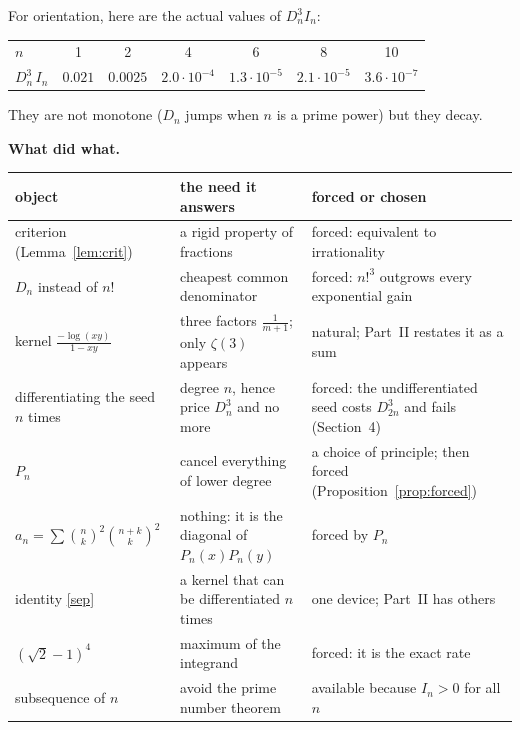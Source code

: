 \documentclass[11pt]{article}
\theoremstyle{remark}
\newcommand{\q}[1]{\medskip\noindent\textbf{#1}}
\begin{document}
\noindent For orientation, here are the actual values of $D_n^3I_n$:
\begin{center}\small
\begin{tabular}{@{}lcccccc@{}}
\toprule
$n$ & 1 & 2 & 4 & 6 & 8 & 10\\
$D_n^3\,I_n$ & $0.021$ & $0.0025$ & $2.0\cdot10^{-4}$ & $1.3\cdot10^{-5}$ & $2.1\cdot10^{-5}$ &
$3.6\cdot10^{-7}$\\
\bottomrule
\end{tabular}
\end{center}
They are not monotone ($D_n$ jumps when $n$ is a prime power) but they decay.

\q{What did what.}
\begin{center}\small
\begin{tabular}{@{}p{43mm}p{52mm}p{52mm}@{}}
\toprule
object & the need it answers & forced or chosen\\
\midrule
criterion (Lemma~\ref{lem:crit}) & a rigid property of fractions & forced: equivalent to
irrationality\\
$D_n$ instead of $n!$ & cheapest common denominator & forced: $n!^3$ outgrows every exponential gain\\
kernel $\frac{-\log(xy)}{1-xy}$ & three factors $\frac1{m+1}$; only $\zeta(3)$ appears &
natural; Part~II restates it as a sum\\
differentiating the seed $n$ times & degree $n$, hence price $D_n^3$ and no more & forced: the
undifferentiated seed costs $D_{2n}^3$ and fails (Section~4)\\
$P_n$ & cancel everything of lower degree & a choice of principle; then forced
(Proposition~\ref{prop:forced})\\
$a_n=\sum\binom nk^2\binom{n+k}k^2$ & nothing: it is the diagonal of $P_n(x)P_n(y)$ & forced by
$P_n$\\
identity \eqref{sep} & a kernel that can be differentiated $n$ times & one device; Part~II has
others\\
$(\sqrt2-1)^4$ & maximum of the integrand & forced: it is the exact rate\\
subsequence of $n$ & avoid the prime number theorem & available because $I_n>0$ for all $n$\\
\bottomrule
\end{tabular}
\end{center}
\end{document}
